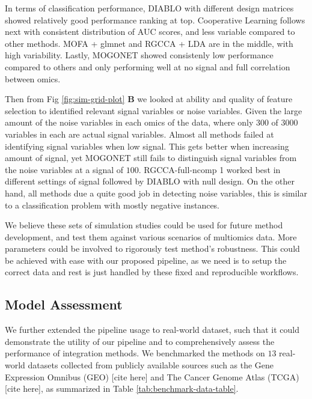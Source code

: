 \documentclass[
]{article}
\begin{document}
In terms of classification performance, DIABLO with different design matrices showed relatively good performance ranking at top. Cooperative Learning follows next with consistent distribution of AUC scores, and less variable compared to other methods. MOFA + glmnet and RGCCA + LDA are in the middle, with high variability. Lastly, MOGONET showed consistenly low performance compared to others and only performing well at no signal and full correlation between omics.

Then from Fig \ref{fig:sim-grid-plot} \textbf{B} we looked at ability and quality of feature selection to identified relevant signal variables or noise variables. Given the large amount of the noise variables in each omics of the data, where only \(300\) of \(3000\) variables in each are actual signal variables. Almost all methods failed at identifying signal variables when low signal. This gets better when increasing amount of signal, yet MOGONET still fails to distinguish signal variables from the noise variables at a signal of \(100\). RGCCA-full-ncomp 1 worked best in different settings of signal followed by DIABLO with null design. On the other hand, all methods due a quite good job in detecting noise variables, this is similar to a classification problem with mostly negative instances.

We believe these sets of simulation studies could be used for future method development, and test them against various scenarios of multiomics data. More parameters could be involved to rigorously test method's robustness. This could be achieved with ease with our proposed pipeline, as we need is to setup the correct data and rest is just handled by these fixed and reproducible workflows.

\hypertarget{model-assessment}{%
\subsection{Model Assessment}\label{model-assessment}}

We further extended the pipeline usage to real-world dataset, such that it could
demonstrate the utility of our pipeline and to comprehensively assess the performance of integration methods. We benchmarked the methods on \(13\) real-world datasets collected from publicly available sources such as the Gene Expression Omnibus (GEO) {[}cite here{]} and The Cancer Genome Atlas (TCGA) {[}cite here{]}, as summarized in Table \ref{tab:benchmark-data-table}.

\begingroup\fontsize{7}{9}\selectfont
\end{document}
